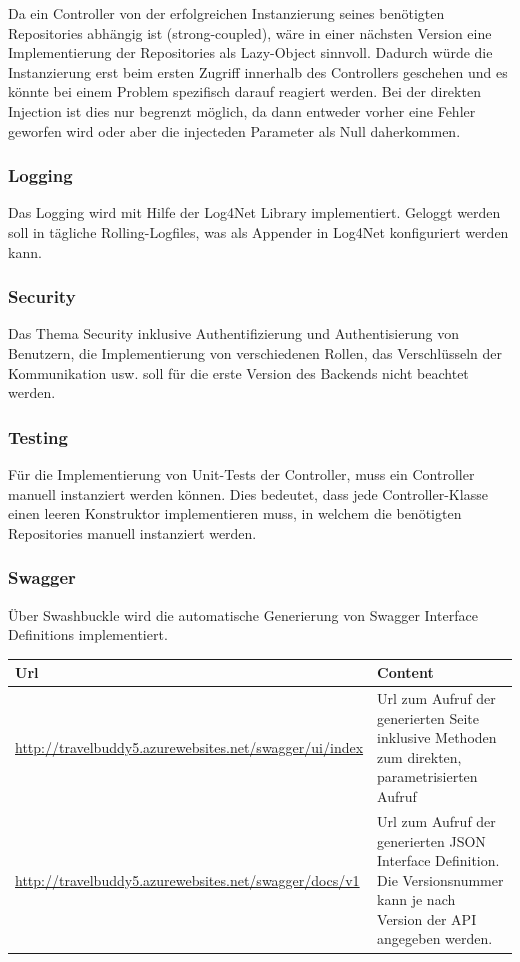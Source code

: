 \documentclass[a4paper,10pt,xetex]{article}
\begin{document}
  Da ein Controller von der erfolgreichen Instanzierung seines ben\"otigten Repositories abh\"angig ist (strong-coupled),
  w\"are in einer n\"achsten Version eine Implementierung der Repositories als Lazy-Object sinnvoll. Dadurch w\"urde die
  Instanzierung erst beim ersten Zugriff innerhalb des Controllers geschehen und es k\"onnte bei einem Problem spezifisch
  darauf reagiert werden. Bei der direkten Injection ist dies nur begrenzt m\"oglich, da dann entweder vorher eine Fehler
  geworfen wird oder aber die injecteden Parameter als Null daherkommen.


\subsubsection[Logging]{Logging}

  Das Logging wird mit Hilfe der Log4Net Library implementiert. Geloggt werden soll in t\"agliche Rolling-Logfiles, was
  als Appender in Log4Net konfiguriert werden kann.


\bigskip

\subsubsection[Security]{Security}
  Das Thema Security inklusive Authentifizierung und Authentisierung von Benutzern, die Implementierung von verschiedenen
  Rollen, das Verschl\"usseln der Kommunikation usw. soll f\"ur die erste Version des Backends nicht beachtet werden.

\subsubsection[Testing\ \ ]{Testing\ \ }
  F\"ur die Implementierung von Unit-Tests der Controller, muss ein Controller manuell instanziert werden k\"onnen. Dies
  bedeutet, dass jede Controller-Klasse einen leeren Konstruktor implementieren muss, in welchem die ben\"otigten
  Repositories manuell instanziert werden.

\subsubsection[Swagger]{Swagger}
  \"Uber Swashbuckle wird die automatische Generierung von Swagger Interface Definitions implementiert.

\begin{longtabu} to \textwidth { | l | X[l] | }
  \hline
  \textbf{Url}  & \textbf{Content} \\
  \hline
  \endhead

    \url{http://travelbuddy5.azurewebsites.net/swagger/ui/index} &
    Url zum Aufruf der generierten Seite inklusive Methoden zum direkten, parametrisierten
      Aufruf\\\hline
    \url{http://travelbuddy5.azurewebsites.net/swagger/docs/v1} &
    Url zum Aufruf der generierten JSON Interface Definition. Die Versionsnummer kann je nach
      Version der API angegeben werden.\\\hline
\end{longtabu}
\end{document}
